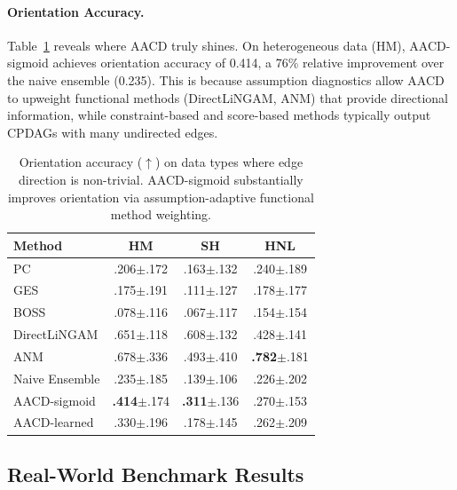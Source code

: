 \documentclass{article}
\newcommand{\aacd}{\textsc{AACD}}
\begin{document}
\paragraph{Orientation Accuracy.} Table~\ref{tab:orientation} reveals where \aacd{} truly shines. On heterogeneous data (HM), \aacd{}-sigmoid achieves orientation accuracy of 0.414, a 76\% relative improvement over the naive ensemble (0.235). This is because assumption diagnostics allow \aacd{} to upweight functional methods (DirectLiNGAM, ANM) that provide directional information, while constraint-based and score-based methods typically output CPDAGs with many undirected edges.

\begin{table}[t]
\caption{Orientation accuracy ($\uparrow$) on data types where edge direction is non-trivial. \aacd{}-sigmoid substantially improves orientation via assumption-adaptive functional method weighting.}
\label{tab:orientation}
\centering
\small
\begin{tabular}{lccc}
\toprule
Method & HM & SH & HNL \\
\midrule
PC              & .206{\scriptsize$\pm$.172} & .163{\scriptsize$\pm$.132} & .240{\scriptsize$\pm$.189} \\
GES             & .175{\scriptsize$\pm$.191} & .111{\scriptsize$\pm$.127} & .178{\scriptsize$\pm$.177} \\
BOSS            & .078{\scriptsize$\pm$.116} & .067{\scriptsize$\pm$.117} & .154{\scriptsize$\pm$.154} \\
DirectLiNGAM    & .651{\scriptsize$\pm$.118} & .608{\scriptsize$\pm$.132} & .428{\scriptsize$\pm$.141} \\
ANM             & .678{\scriptsize$\pm$.336} & .493{\scriptsize$\pm$.410} & \textbf{.782}{\scriptsize$\pm$.181} \\
\midrule
Naive Ensemble  & .235{\scriptsize$\pm$.185} & .139{\scriptsize$\pm$.106} & .226{\scriptsize$\pm$.202} \\
\aacd{}-sigmoid & \textbf{.414}{\scriptsize$\pm$.174} & \textbf{.311}{\scriptsize$\pm$.136} & .270{\scriptsize$\pm$.153} \\
\aacd{}-learned & .330{\scriptsize$\pm$.196} & .178{\scriptsize$\pm$.145} & .262{\scriptsize$\pm$.209} \\
\bottomrule
\end{tabular}
\end{table}

\subsection{Real-World Benchmark Results}
\end{document}
